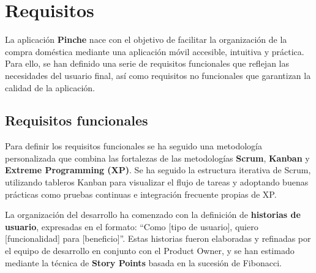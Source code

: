 



\section{Requisitos}
\label{sec:requisitos}

La aplicación \textbf{Pinche} nace con el objetivo de facilitar la organización de la compra doméstica mediante una aplicación móvil accesible, intuitiva y práctica. Para ello, se han definido una serie de requisitos funcionales que reflejan las necesidades del usuario final, así como requisitos no funcionales que garantizan la calidad de la aplicación.

\subsection{Requisitos funcionales}

Para definir los requisitos funcionales se ha seguido una metodolog\'ia personalizada que combina las fortalezas de las metodolog\'ias \textbf{Scrum}, \textbf{Kanban} y \textbf{Extreme Programming (XP)}. Se ha seguido la estructura iterativa de Scrum, utilizando tableros Kanban para visualizar el flujo de tareas y adoptando buenas prácticas como pruebas continuas e integración frecuente propias de XP.

La organización del desarrollo ha comenzado con la definición de \textbf{historias de usuario}, expresadas en el formato: ``Como [tipo de usuario], quiero [funcionalidad] para [beneficio]''. Estas historias fueron elaboradas y refinadas por el equipo de desarrollo en conjunto con el Product Owner, y se han estimado mediante la técnica de \textbf{Story Points} basada en la sucesión de Fibonacci.

